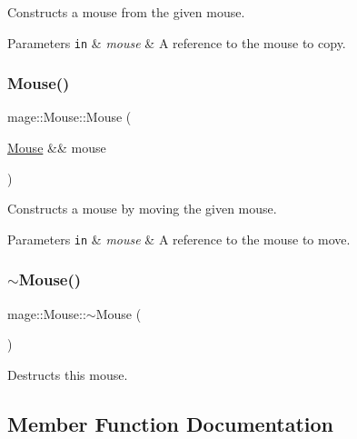 Constructs a mouse from the given mouse.


\begin{DoxyParams}[1]{Parameters}
\mbox{\tt in}  & {\em mouse} & A reference to the mouse to copy. \\
\hline
\end{DoxyParams}
\hypertarget{classmage_1_1_mouse_ad91b06f0a0df67eefc972997169d12c2}{}\label{classmage_1_1_mouse_ad91b06f0a0df67eefc972997169d12c2} 
\subsubsection{\texorpdfstring{Mouse()}{Mouse()}\hspace{0.1cm}{\footnotesize\ttfamily [3/3]}}
{\footnotesize\ttfamily mage\+::\+Mouse\+::\+Mouse (\begin{DoxyParamCaption}\item[{\hyperlink{classmage_1_1_mouse}{Mouse} \&\&}]{mouse }\end{DoxyParamCaption})\hspace{0.3cm}{\ttfamily [default]}}

Constructs a mouse by moving the given mouse.


\begin{DoxyParams}[1]{Parameters}
\mbox{\tt in}  & {\em mouse} & A reference to the mouse to move. \\
\hline
\end{DoxyParams}
\hypertarget{classmage_1_1_mouse_a855f1075ae774c8417d3da7a1e02d580}{}\label{classmage_1_1_mouse_a855f1075ae774c8417d3da7a1e02d580} 
\subsubsection{\texorpdfstring{$\sim$\+Mouse()}{~Mouse()}}
{\footnotesize\ttfamily mage\+::\+Mouse\+::$\sim$\+Mouse (\begin{DoxyParamCaption}{ }\end{DoxyParamCaption})\hspace{0.3cm}{\ttfamily [default]}}

Destructs this mouse. 

\subsection{Member Function Documentation}
\hypertarget{classmage_1_1_mouse_ab94f18e3197e37b7837de715085c846d}{}\label{classmage_1_1_mouse_ab94f18e3197e37b7837de715085c846d} 
